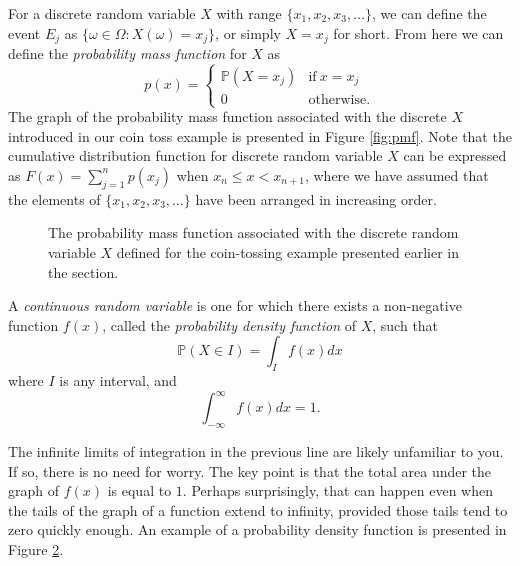 \documentclass[../book.tex]{subfiles}
\begin{document}
For a discrete random variable \(X\) with range \(\{ x_1, x_2, x_3, \ldots \}\), we can define the event \(E_j\) as \(\{ \omega\in \Omega : X(\omega) = x_j\}\), or simply \(X=x_j\) for short. From here we can define the \emph{probability mass function} for \(X\) as
\begin{equation}\label{eq:rv-5}
p(x)
=
\begin{cases}
  \mathbb{P}( X = x_j ) & \text{if}\ x = x_j \\
  0 & \text{otherwise.}
\end{cases}
\end{equation}
The graph of the probability mass function associated with the discrete \(X\) introduced in our coin toss example is presented in Figure \ref{fig:pmf}.
Note that the cumulative distribution function for discrete random variable \(X\) can be expressed as \(F(x) = \displaystyle\sum_{j=1}^n p(x_j)\) when \(x_n \leq x < x_{n+1}\), where we have assumed that the elements of \(\{ x_1, x_2, x_3, \ldots\}\) have been arranged in increasing order.

\begin{figure}[htbp]
  \centering
  \caption{The probability mass function associated with the discrete random variable \(X\) defined for the coin-tossing example presented earlier in the section.}
  \label{fig:rv-1}
\end{figure}

A \emph{continuous random variable} is one for which there exists a non-negative function \(f(x)\), called the \emph{probability density function} of \(X\), such that
\begin{equation}\label{eq:rv-6}
\mathbb{P} (  X \in I ) = \int_I f(x) dx
\end{equation}
where \(I\) is any interval, and
\begin{equation}\label{eq:rv-7}
\int_{-\infty}^{\infty} f(x) dx = 1.
\end{equation}

The infinite limits of integration in the previous line are likely unfamiliar to you. If so, there is no need for worry. The key point is that the total area under the graph of \(f (x)\) is equal to \(1\). Perhaps surprisingly, that can happen even when the tails of the graph of a function extend to infinity, provided those tails tend to zero quickly enough. An example of a probability density function is presented in Figure \ref{fig:pdf}.

\begin{figure}[htbp]
  \centering
  \label{fig:pdf}
\end{figure}
\end{document}
